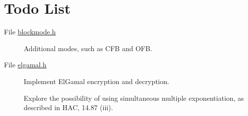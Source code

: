 \hypertarget{todo}{}\section{Todo List}\label{todo}
\label{todo__todo000001}
\hypertarget{todo__todo000001}{}
 \begin{description}
\item[File \hyperlink{blockmode_8h}{blockmode.h} ]Additional modes, such as CFB and OFB.\end{description}


\label{todo__todo000002}
\hypertarget{todo__todo000002}{}
 \begin{description}
\item[File \hyperlink{elgamal_8h}{elgamal.h} ]Implement El\-Gamal encryption and decryption. 

Explore the possibility of using simultaneous multiple exponentiation, as described in HAC, 14.87 (iii). \end{description}
